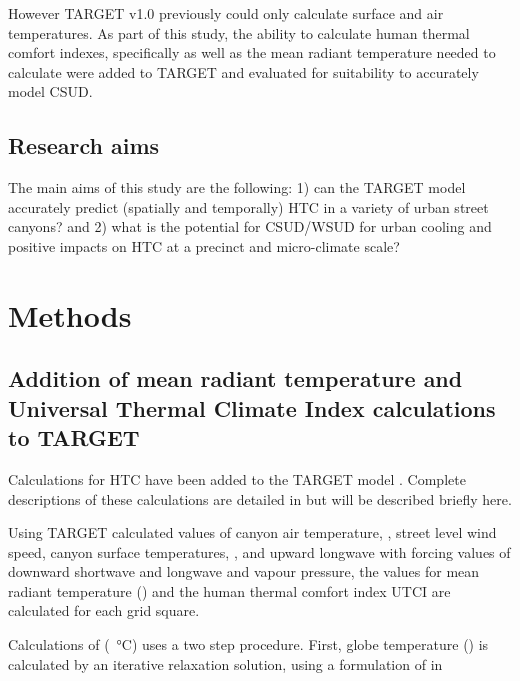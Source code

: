 \documentclass[final,3p,times,authoryear]{elsarticle}
\begin{document}
However TARGET v1.0 previously could only calculate surface and air temperatures. As part of this study, the ability to calculate human thermal comfort indexes, specifically  as well as the mean radiant temperature  needed to calculate  were added to TARGET and evaluated for suitability to accurately model CSUD.

\subsection{Research aims}
The main aims of this study are the following: 1) can the TARGET model accurately predict (spatially and temporally) HTC in a variety of urban street canyons? and 2) what is the potential for CSUD/WSUD for urban cooling and positive impacts on HTC at a precinct and micro-climate scale?




\section{Methods}\label{sec:Methods}



\subsection{Addition of mean radiant temperature and Universal Thermal Climate Index calculations to TARGET}\label{sec:tmrtutci}

Calculations for HTC have been added to the TARGET model \citep{Broadbent2018}. Complete descriptions of these calculations are detailed in \cite{Nice2018} but will be described briefly here.

Using TARGET calculated values of canyon air temperature, , street level wind speed, canyon surface temperatures, , and upward longwave with forcing values of downward shortwave and longwave and vapour pressure, the values for mean radiant temperature () and the human thermal comfort index UTCI are calculated for each grid square.

Calculations of  (\SI{}{\degreeCelsius}) uses a two step procedure. First, globe temperature () is calculated by an iterative relaxation solution, using a formulation of \cite{Liljegren2008} in  
\end{document}
